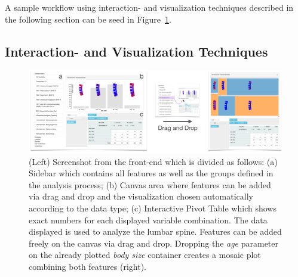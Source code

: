 \documentclass[journal]{style/vgtc} 			          %
\begin{document}
%
%
A sample workflow using interaction- and visualization techniques described in the following section can be seed in Figure~\ref{fig:visualization}.

\subsection{Interaction- and Visualization Techniques} \label{Interaction- and Visualization Techniques}
\begin{figure}[htb]
 \centering
 \includegraphics[width=1\textwidth, resolution=300]{figures/visualization}
 \caption{(Left) Screenshot from the front-end which is divided as follows: (a) Sidebar which contains all features as well as the groups defined in the analysis process; (b) Canvas area where features can be added via drag and drop and the visualization chosen automatically according to the data type; (c) Interactive Pivot Table which shows exact numbers for each displayed variable combination. The data displayed is used to analyze the lumbar spine. Features can be added freely on the canvas via drag and drop. Dropping the \emph{age} parameter on the already plotted \emph{body size} container creates a mosaic plot combining both features (right).
 }
 \label{fig:visualization}
\end{figure}
\end{document}
